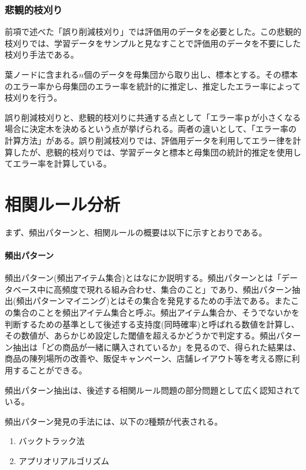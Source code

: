\documentclass[dvipdfmx]{jsarticle}
\begin{document}
\subsubsection{悲観的枝刈り}
前項で述べた「誤り削減枝刈り」では評価用のデータを必要とした。この悲観的枝刈りでは、学習データをサンプルと見なすことで評価用のデータを不要にした枝刈り手法である。\par
葉ノードに含まれる$n$個のデータを母集団から取り出し、標本とする。その標本のエラー率から母集団のエラー率を統計的に推定し、推定したエラー率によって枝刈りを行う。\par
誤り削減枝刈りと、悲観的枝刈りに共通する点として「エラー率ｐが小さくなる場合に決定木を決めるという点が挙げられる。両者の違いとして、「エラー率の計算方法」がある。誤り削減枝刈りでは、評価用データを利用してエラー律を計算したが、悲観的枝刈りでは、学習データと標本と母集団の統計的推定を使用してエラー率を計算している。
\section{相関ルール分析}
まず、頻出パターンと、相関ルールの概要は以下に示すとおりである。
\paragraph{頻出パターン}
頻出パターン(頻出アイテム集合)とはなにか説明する。頻出パターンとは「データベース中に高頻度で現れる組み合わせ、集合のこと」であり、頻出パターン抽出(頻出パターンマイニング)とはその集合を発見するための手法である。またこの集合のことを頻出アイテム集合と呼ぶ。頻出アイテム集合か、そうでないかを判断するための基準として後述する支持度(同時確率)と呼ばれる数値を計算し、その数値が、あらかじめ設定した閾値を超えるかどうかで判定する。頻出パターン抽出は「どの商品が一緒に購入されているか」を見るので、得られた結果は、商品の陳列場所の改善や、販促キャンペーン、店舗レイアウト等を考える際に利用することができる。\par
頻出パターン抽出は、後述する相関ルール問題の部分問題として広く認知されている。\par
頻出パターン発見の手法には、以下の2種類が代表される。
\begin{enumerate}
  \item バックトラック法
  \item アプリオリアルゴリズム
\end{enumerate}
\end{document}
